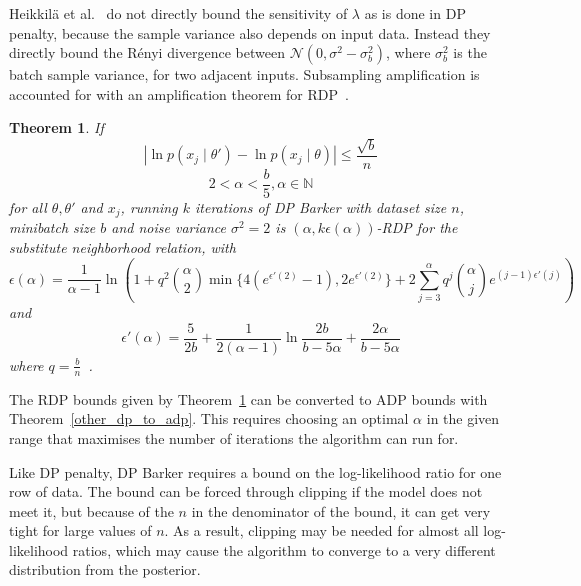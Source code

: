 \documentclass[english,twoside,openright]{HYgraduMLDS}
\newtheorem{theorem}{Theorem}
\newcommand{\N}{\mathbb{N}}
\newcommand{\caln}{{\mathcal{N}}}
\begin{document}
Heikkilä et al.~\cite{HeikkilaJDH19} do not directly bound the sensitivity
of \(\lambda\) as is done in DP penalty, because the sample variance also 
depends on input data. Instead they directly bound the Rényi divergence 
between \(\caln(0, \sigma^2 - \sigma^2_b)\), where \(\sigma^2_b\) is the 
batch sample variance, for two adjacent inputs. Subsampling amplification 
is accounted for with an amplification theorem for RDP~\cite{WangBK19}.

\begin{theorem}\label{dp_barker_theorem}
    If
    \[
        |\ln p(x_j\mid \theta') - \ln p(x_j\mid \theta)| \leq \frac{\sqrt{b}}{n}
    \]
    \[
        2 < \alpha < \frac{b}{5}, \alpha \in \N
    \]
    for all \(\theta, \theta'\) and \(x_{j}\),
    running \(k\) iterations of DP Barker with dataset size \(n\),
    minibatch size \(b\) and noise variance \(\sigma^{2} = 2\)
    is \((\alpha, k\epsilon(\alpha))\)-RDP for the substitute neighborhood
    relation, with
    \[
        \epsilon(\alpha) = \frac{1}{\alpha - 1}\ln \left(
        1 + q^2\binom{\alpha}{2}\min\{4(e^{\epsilon'(2)} - 1), 2e^{\epsilon'(2)}\}
        + 2 \sum_{j=3}^\alpha q^j\binom{\alpha}{j}e^{(j-1)\epsilon'(j)}\right)
    \]
    and 
    \[
        \epsilon'(\alpha) = \frac{5}{2b} + \frac{1}{2(\alpha - 1)}
        \ln \frac{2b}{b - 5\alpha} + \frac{2\alpha}{b - 5\alpha}
    \]
    where \(q = \frac{b}{n}\)~\cite{HeikkilaJDH19}.
\end{theorem}
The RDP bounds given by Theorem~\ref{dp_barker_theorem} can be converted to
ADP bounds with Theorem~\ref{other_dp_to_adp}. This requires choosing an
optimal \(\alpha\) in the given range that maximises the number of iterations
the algorithm can run for.


Like DP penalty, DP Barker requires a bound on the log-likelihood ratio for
one row of data. The bound can be forced through clipping if the model does not 
meet it, but because of the \(n\) in the denominator of the bound, it can get 
very tight for large values of \(n\). As a result, clipping may be needed for 
almost all log-likelihood ratios, which may cause the algorithm to converge
to a very different distribution from the posterior.
\end{document}
